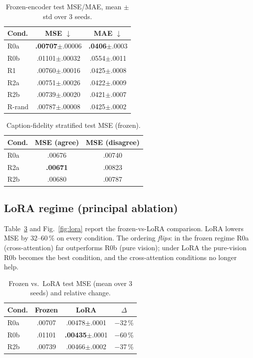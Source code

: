\documentclass[conference]{IEEEtran}
\begin{document}
\begin{table}[t]
\centering\footnotesize
\caption{Frozen-encoder test MSE/MAE, mean $\pm$ std over 3 seeds.}
\label{tab:frozen}
\setlength{\tabcolsep}{4pt}
\begin{tabular}{@{}lcc@{}}
\toprule
\textbf{Cond.} & \textbf{MSE} $\downarrow$ & \textbf{MAE} $\downarrow$ \\
\midrule
R0a    & \textbf{.00707}$\pm$.00006 & \textbf{.0406}$\pm$.0003 \\
R0b    & .01101$\pm$.00032 & .0554$\pm$.0011 \\
R1     & .00760$\pm$.00016 & .0425$\pm$.0008 \\
R2a    & .00751$\pm$.00026 & .0422$\pm$.0009 \\
R2b    & .00739$\pm$.00020 & .0421$\pm$.0007 \\
R-rand & .00787$\pm$.00008 & .0425$\pm$.0002 \\
\bottomrule
\end{tabular}
\end{table}

\begin{table}[t]
\centering\footnotesize
\caption{Caption-fidelity stratified test MSE (frozen).}
\label{tab:fidelity}
\begin{tabular}{@{}lcc@{}}
\toprule
\textbf{Cond.} & \textbf{MSE (agree)} & \textbf{MSE (disagree)} \\
\midrule
R0a & .00676 & .00740 \\
R2a & \textbf{.00671} & .00823 \\
R2b & .00680 & .00787 \\
\bottomrule
\end{tabular}
\end{table}

\subsection{LoRA regime (principal ablation)}
Table~\ref{tab:lora} and Fig.~\ref{fig:lora} report the frozen-vs-LoRA
comparison. LoRA lowers MSE by 32--60\,\% on every condition. The ordering
\emph{flips}: in the frozen regime R0a (cross-attention) far outperforms R0b
(pure vision); under LoRA the pure-vision R0b becomes the best condition, and
the cross-attention conditions no longer help.

\begin{table}[t]
\centering\footnotesize
\caption{Frozen vs.\ LoRA test MSE (mean over 3 seeds) and relative change.}
\label{tab:lora}
\setlength{\tabcolsep}{5pt}
\begin{tabular}{@{}lccc@{}}
\toprule
\textbf{Cond.} & \textbf{Frozen} & \textbf{LoRA} & \textbf{$\Delta$} \\
\midrule
R0a & .00707 & .00478$\pm$.0001 & $-$32\,\% \\
R0b & .01101 & \textbf{.00435}$\pm$.0001 & $-$60\,\% \\
R2b & .00739 & .00466$\pm$.0002 & $-$37\,\% \\
\bottomrule
\end{tabular}
\end{table}
\end{document}
